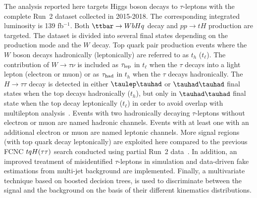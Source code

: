 
The analysis reported here targets Higgs boson decays to 
$\tau$-leptons with the complete Run~2 dataset collected in 2015-2018. The corresponding integrated luminosity is 139 fb$^{-1}$. Both $\ttbar \to WbHq$ decay and $pp \to tH$ production are targeted. The dataset is divided into several final states depending on the production mode and
the  $W$ decay. Top quark pair production events where the $W$ boson decays hadronically (leptonically) are referred to as $t_h$ ($t_{\ell}$). The contribution of 
$W\rightarrow\tau\nu$ is included as $\tau_{\mathrm{lep}}$ in $t_{\ell}$ when the $\tau$ decays into a light lepton (electron or muon) or as $\tau_\text{had}$ 
in $t_h$ when the $\tau$ decays hadronically.
The $H\rightarrow \tau\tau$ decay is detected in
either $\tlhad$ or $\thadhad$ final states when the top decays hadronically ($t_h$), but only in $\thadhad$ final state when the top decay leptonically ($t_{\ell}$) in order to avoid overlap with
multilepton analysis~\cite{Aaboud:2018pob}. 
Events with two hadronically decaying $\tau$-leptons without electron or muon are named hadronic channels. Events with at least one \tauhad with an additional electron or muon are named leptonic channels. More signal regions (with top quark decay leptonically) are exploited here compared to the previous FCNC $tqH(\tau\tau)$ search conducted using partial Run~2 data~\cite{fcnc36}.
In addition, an improved treatment of misidentified $\tau$-leptons in simulation and data-driven
fake estimations from multi-jet background are implemented.
Finally, a multivariate technique based on boosted decision trees, is used to discriminate between the signal and the background on the basis of their different kinematics distributions. 

